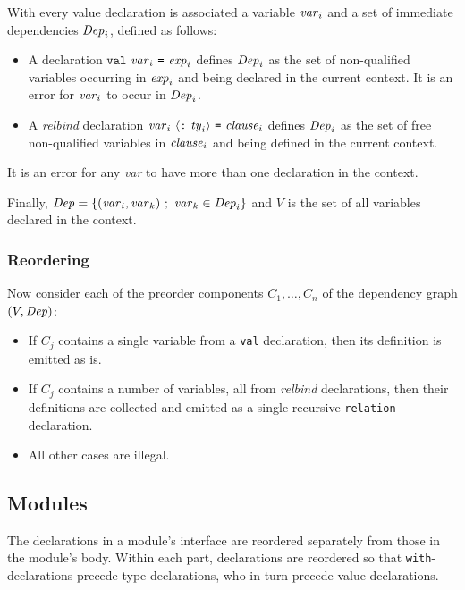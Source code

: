 With every value declaration is associated a variable $\mbox{\textit{var}}_i$
and a set of immediate dependencies $\mbox{\textit{Dep}}_i$, defined as follows:
\begin{itemize}
\item A declaration $\mbox{\texttt{val}}~\mbox{\textit{var}}_i~\mbox{\texttt{=}}~\mbox{\textit{exp}}_i$
defines $\mbox{\textit{Dep}}_i$ as the set of non-qualified variables
occurring in $\mbox{\textit{exp}}_i$ and being declared in the current context.
It is an error for $\mbox{\textit{var}}_i$ to occur in $\mbox{\textit{Dep}}_i$.

\item A \emph{relbind} declaration $\mbox{\textit{var}}_i~\langle\mbox{\texttt{:}}~\mbox{\textit{ty}}_i\rangle~\mbox{\texttt{=}}~\mbox{\textit{clause}}_i$
defines $\mbox{\textit{Dep}}_i$ as the set of free non-qualified variables
in $\mbox{\textit{clause}}_i$ and being defined in the current context.
\end{itemize}

It is an error for any \emph{var} to have more than one declaration in the context.

Finally, $\mbox{\textit{Dep}}=\{(\mbox{\textit{var}}_i,\mbox{\textit{var}}_k)~;~\mbox{\textit{var}}_k\in\mbox{\textit{Dep}}_i\}$
and $V$ is the set of all variables declared in the context.

\subsubsection{Reordering}
Now consider each of the preorder components $C_1,\ldots,C_n$ of the
dependency graph $(V,\mbox{\textit{Dep}})$:
\begin{itemize}
\item If $C_j$ contains a single variable from a \texttt{val} declaration,
then its definition is emitted as is.
\item If $C_j$ contains a number of variables, all
from \emph{relbind} declarations, then their definitions are
collected and emitted as a single recursive \texttt{relation} declaration.
\item All other cases are illegal.
\end{itemize}

\subsection{Modules}
The declarations in a module's interface are reordered separately
from those in the module's body.
Within each part, declarations are reordered so that \texttt{with}-declarations
precede type declarations, who in turn precede value declarations.
